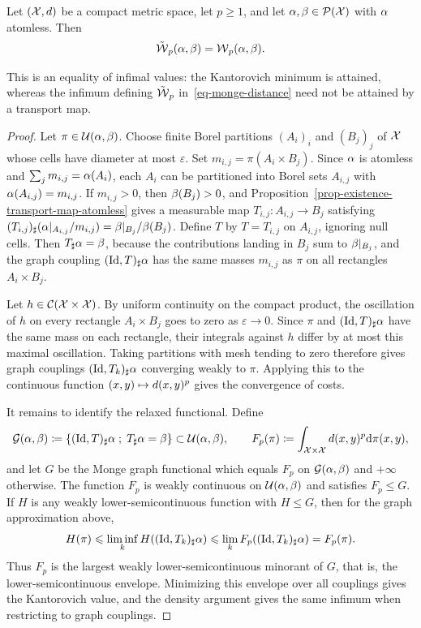 \begin{prop}\label{prop-kantorovich-relaxation-monge}
	Let $(\mathcal{X},d)$ be a compact metric space, let $p\geq1$, and let $\alpha,\beta\in\mathcal{P}(\mathcal{X})$ with $\alpha$ atomless. Then
	\[
		\tilde{\operatorname{\mathcal{W}}}_p(\alpha,\beta)=\operatorname{\mathcal{W}}_p(\alpha,\beta).
	\]
\end{prop}
This is an equality of infimal values: the Kantorovich minimum is attained, whereas the infimum defining $\tilde{\operatorname{\mathcal{W}}}_p$ in~\eqref{eq-monge-distance} need not be attained by a transport map.
\begin{proof}
	Let $\pi\in\mathcal{U}(\alpha,\beta)$. Choose finite Borel partitions $(A_i)_i$ and $(B_j)_j$ of $\mathcal{X}$ whose cells have diameter at most $\varepsilon$. Set $m_{i,j}=\pi(A_i\times B_j)$. Since $\alpha$ is atomless and $\sum_j m_{i,j}=\alpha(A_i)$, each $A_i$ can be partitioned into Borel sets $A_{i,j}$ with $\alpha(A_{i,j})=m_{i,j}$. If $m_{i,j}>0$, then $\beta(B_j)>0$, and Proposition~\ref{prop-existence-transport-map-atomless} gives a measurable map
	$T_{i,j}:A_{i,j}\to B_j$ satisfying
	$(T_{i,j})_\sharp(\alpha|_{A_{i,j}}/m_{i,j})=\beta|_{B_j}/\beta(B_j)$.
	Define $T$ by $T=T_{i,j}$ on $A_{i,j}$, ignoring null cells. Then $T_\sharp\alpha=\beta$, because the contributions landing in $B_j$ sum to $\beta|_{B_j}$, and the graph coupling $(\mathrm{Id},T)_\sharp\alpha$ has the same masses $m_{i,j}$ as $\pi$ on all rectangles $A_i\times B_j$.

	Let $h\in\mathcal{C}(\mathcal{X}\times\mathcal{X})$. By uniform continuity on the compact product, the oscillation of $h$ on every rectangle $A_i\times B_j$ goes to zero as $\varepsilon\to0$. Since $\pi$ and $(\mathrm{Id},T)_\sharp\alpha$ have the same mass on each rectangle, their integrals against $h$ differ by at most this maximal oscillation. Taking partitions with mesh tending to zero therefore gives graph couplings $(\mathrm{Id},T_k)_\sharp\alpha$ converging weakly to $\pi$. Applying this to the continuous function $(x,y)\mapsto d(x,y)^p$ gives the convergence of costs.

	It remains to identify the relaxed functional. Define
	\[
		\mathcal G(\alpha,\beta)
		\coloneqq
		\left\{ (\mathrm{Id},T)_\sharp\alpha \;;\; T_\sharp\alpha=\beta \right\}
		\subset\mathcal{U}(\alpha,\beta),
		\qquad
		F_p(\pi)\coloneqq\int_{\mathcal{X}\times\mathcal{X}}d(x,y)^p\mathrm{d}\pi(x,y),
	\]
	and let $G$ be the Monge graph functional which equals $F_p$ on $\mathcal G(\alpha,\beta)$ and $+\infty$ otherwise. The function $F_p$ is weakly continuous on $\mathcal{U}(\alpha,\beta)$ and satisfies $F_p\leq G$. If $H$ is any weakly lower-semicontinuous function with $H\leq G$, then for the graph approximation above,
	\[
		H(\pi)\leqslant\liminf_k H((\mathrm{Id},T_k)_\sharp\alpha)
		\leqslant
		\lim_k F_p((\mathrm{Id},T_k)_\sharp\alpha)=F_p(\pi).
	\]
	Thus $F_p$ is the largest weakly lower-semicontinuous minorant of $G$, that is, the lower-semicontinuous envelope. Minimizing this envelope over all couplings gives the Kantorovich value, and the density argument gives the same infimum when restricting to graph couplings.
\end{proof}

